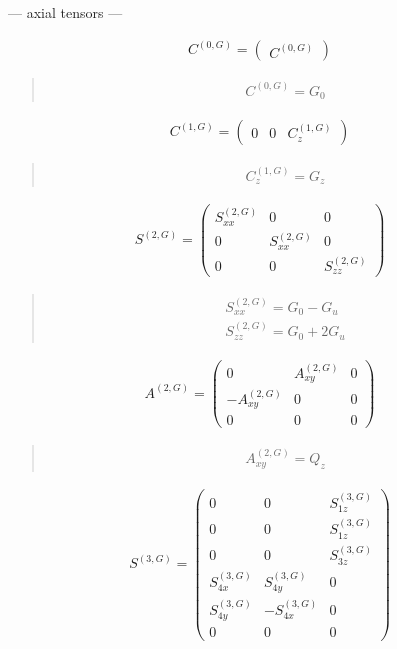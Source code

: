 \documentclass[fleqn,10pt]{jsarticle}
\begin{document}
\newpage
\begin{center}\LARGE --- axial tensors ---\end{center}
\begin{align*}
C^{(0,G)} = \begin{pmatrix} C^{(0,G)} \end{pmatrix}
\end{align*}
\begin{quote}
\begin{align*}
& C^{(0,G)} = G_{0}
\end{align*}
\end{quote}
\begin{align*}
C^{(1,G)} = \begin{pmatrix} 0 & 0 & C^{(1,G)}_{z} \end{pmatrix}
\end{align*}
\begin{quote}
\begin{align*}
& C^{(1,G)}_{z} = G_{z}
\end{align*}
\end{quote}
\begin{align*}
S^{(2,G)} = \begin{pmatrix} S^{(2,G)}_{xx} & 0 & 0 \\ 0 & S^{(2,G)}_{xx} & 0 \\ 0 & 0 & S^{(2,G)}_{zz} \end{pmatrix}
\end{align*}
\begin{quote}
\begin{align*}
& S^{(2,G)}_{xx} = G_{0} - G_{u} \\
& S^{(2,G)}_{zz} = G_{0} + 2 G_{u}
\end{align*}
\end{quote}
\begin{align*}
A^{(2,G)} = \begin{pmatrix} 0 & A^{(2,G)}_{xy} & 0 \\ - A^{(2,G)}_{xy} & 0 & 0 \\ 0 & 0 & 0 \end{pmatrix}
\end{align*}
\begin{quote}
\begin{align*}
& A^{(2,G)}_{xy} = Q_{z}
\end{align*}
\end{quote}
\begin{align*}
S^{(3,G)} = \begin{pmatrix} 0 & 0 & S^{(3,G)}_{1z} \\ 0 & 0 & S^{(3,G)}_{1z} \\ 0 & 0 & S^{(3,G)}_{3z} \\ S^{(3,G)}_{4x} & S^{(3,G)}_{4y} & 0 \\ S^{(3,G)}_{4y} & - S^{(3,G)}_{4x} & 0 \\ 0 & 0 & 0 \end{pmatrix}
\end{align*}
\end{document}
